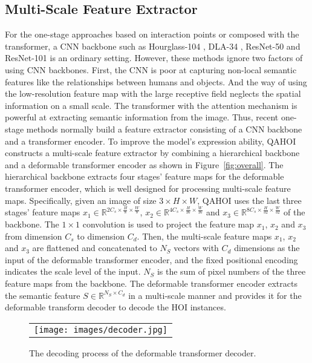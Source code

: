 \documentclass[10pt,twocolumn,letterpaper]{article}
\begin{document}
\subsection{Multi-Scale Feature Extractor}
For the one-stage approaches based on interaction points or composed with the transformer, a CNN backbone such as Hourglass-104
\cite{newell2016stacked}, DLA-34 \cite{yu2018deep},
ResNet-50 and ResNet-101 \cite{he2016deep} is an ordinary setting. However, these methods ignore two factors of using CNN backbones.
First, the CNN is poor at capturing non-local semantic features like the relationships between humans and objects.
And the way of using the low-resolution feature map with the large receptive field neglects the spatial information on a small scale.
The transformer with the attention mechanism is powerful at extracting semantic information from the image. Thus, recent one-stage methods
\cite{kim2021hotr,zou2021end,chen2021reformulating,tamura2021qpic} normally build a feature extractor consisting of a CNN backbone and a transformer encoder.
To improve the model's expression ability, QAHOI constructs a multi-scale feature extractor by combining a hierarchical backbone and a deformable transformer encoder
\cite{zhu2020deformable} as shown in Figure~\ref{fig:overall}.
The hierarchical backbone extracts four stages' feature maps for the deformable transformer encoder, which is well designed for processing multi-scale feature maps.
Specifically, given an image of size $3\times H \times W$,
QAHOI uses the last three stages' feature maps $x_{1}\in\mathbb{R}^{2C_{s}\times\frac{H}{8}\times\frac{W}{8}}$,
$x_{2}\in\mathbb{R}^{4C_{s}\times\frac{H}{16}\times\frac{W}{16}}$ and $x_{3}\in\mathbb{R}^{8C_{s}\times\frac{H}{32}\times\frac{W}{32}}$ of the backbone.
The $1 \times 1$ convolution is used to project the feature map $x_{1}$, $x_{2}$ and $x_{3}$ from dimension $C_{s}$ to dimension $C_{d}$.
Then, the multi-scale feature maps $x_{1}$, $x_{2}$ and $x_{3}$ are flattened and concatenated to $N_{S}$ vectors with $C_{d}$ dimensions as the input of the deformable transformer encoder, and the fixed positional encoding indicates the scale level of the input.
$N_{S}$ is the sum of pixel numbers of the three feature maps from the backbone.
The deformable transformer encoder extracts the semantic feature $S\in \mathbb{R}^{N_{S}\times C_{d}}$ in a multi-scale manner and provides it for the deformable transform decoder to decode the HOI instances.

\begin{figure}
  \centering
  \begin{tabular}{c}
     \texttt{[image: images/decoder.jpg]}
  \end{tabular}
  \caption{The decoding process of the deformable transformer decoder.}
  \label{fig:decoder}
\end{figure}
\end{document}

